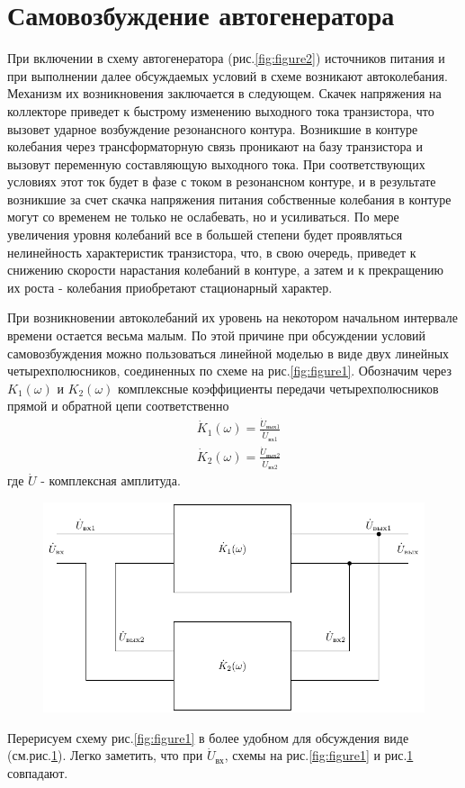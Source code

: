\section{Самовозбуждение автогенератора}
При включении в схему автогенератора (рис.\ref{fig:figure2}) источников питания и при выполнении далее обсуждаемых условий в схеме возникают автоколебания. Механизм их возникновения заключается в следующем. Скачек напряжения на коллекторе приведет к быстрому изменению выходного тока транзистора, что вызовет ударное возбуждение резонансного контура. Возникшие в контуре колебания через трансформаторную связь проникают на базу транзистора и вызовут переменную составляющую выходного тока. При соответствующих условиях этот ток будет в фазе с током в резонансном контуре, и в результате возникшие за счет скачка напряжения питания собственные колебания в контуре могут со временем не только не ослабевать, но и усиливаться. По мере увеличения уровня колебаний все в большей степени будет проявляться нелинейность характеристик транзистора, что, в свою очередь, приведет к снижению скорости нарастания колебаний в контуре, а затем и к прекращению их роста - колебания приобретают стационарный характер.

При возникновении автоколебаний их уровень на некотором начальном интервале времени остается весьма малым. По этой причине при обсуждении условий самовозбуждения можно пользоваться линейной моделью в виде двух линейных четырехполюсников, соединенных по схеме на рис.\ref{fig:figure1}. Обозначим через $K_1(\omega)$ и $K_2(\omega)$ комплексные коэффициенты передачи четырехполюсников прямой и обратной цепи соответственно
\begin{equation*}
\begin{aligned}
&\dot{K}_1(\omega)=\frac{\dot{U}_{\text{вых}1}}{\dot{U}_{\text{вх}1}} \\
&\dot{K}_2(\omega)=\frac{\dot{U}_{\text{вых}2}}{\dot{U}_{\text{вх}2}} 
\end{aligned}
\end{equation*}
где $\dot{U}$ - комплексная амплитуда.
\begin{figure}[h]
	\centering
	\includegraphics[width=\linewidth]{circuit/two.pdf}
	\caption{}
	\label{fig:figure3}
\end{figure}
Перерисуем схему рис.\ref{fig:figure1} в более удобном для обсуждения виде (см.рис.\ref{fig:figure3}). Легко заметить, что при $\dot{U}_\text{вх}$, схемы на рис.\ref{fig:figure1} и рис.\ref{fig:figure3} совпадают.

